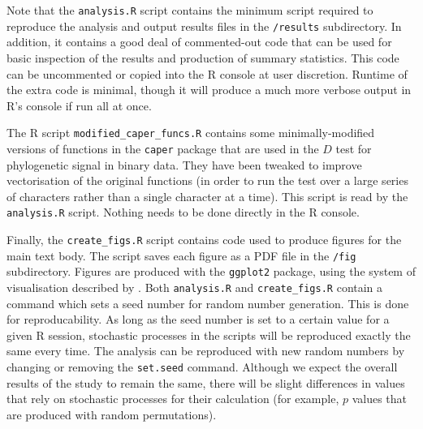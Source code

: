 Note that the \texttt{analysis.R} script contains the minimum script
required to reproduce the analysis and output results files in the
\texttt{/results} subdirectory. In addition, it contains a good deal of
commented-out code that can be used for basic inspection of the results
and production of summary statistics. This code can be uncommented or
copied into the R console at user discretion. Runtime of the extra code
is minimal, though it will produce a much more verbose output in R's
console if run all at once.

The R script \texttt{modified\_caper\_funcs.R} contains some
minimally-modified versions of functions in the \texttt{caper} package
that are used in the \(D\) test for phylogenetic signal in binary data.
They have been tweaked to improve vectorisation of the original
functions (in order to run the test over a large series of characters
rather than a single character at a time). This script is read by the
\texttt{analysis.R} script. Nothing needs to be done directly in the R
console.

Finally, the \texttt{create\_figs.R} script contains code used to
produce figures for the main text body. The script saves each figure as
a PDF file in the \texttt{/fig} subdirectory. Figures are produced with
the \texttt{ggplot2} package, using the system of visualisation
described by \textcite{wilkinson_grammar_2005}. Both \texttt{analysis.R}
and \texttt{create\_figs.R} contain a command which sets a seed number
for random number generation. This is done for reproducability. As long
as the seed number is set to a certain value for a given R session,
stochastic processes in the scripts will be reproduced exactly the same
every time. The analysis can be reproduced with new random numbers by
changing or removing the \texttt{set.seed} command. Although we expect
the overall results of the study to remain the same, there will be
slight differences in values that rely on stochastic processes for their
calculation (for example, \(p\) values that are produced with random
permutations).

